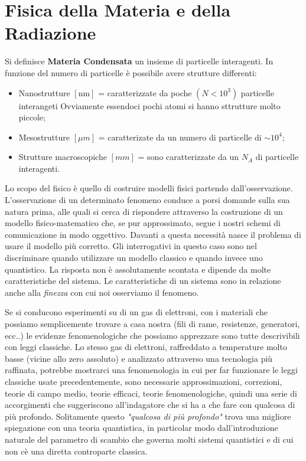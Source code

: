 \section{Fisica della Materia e della Radiazione}
Si definisce \textbf{Materia Condensata} un insieme di particelle interagenti. In funzione del numero di particelle è possibile avere strutture differenti:
\begin{itemize}
	\item Nanostrutture $[\text{nm}]$ = caratterizzate da poche $(N<10^3)$ particelle interangeti Ovviamente essendoci pochi atomi si hanno sttrutture molto piccole;
	\item Mesostrutture $[\mu m]$ = caratterizate da un numero di particelle di $\sim  10^4$;
	\item Strutture macroscopiche $[mm]$ = sono caratterizzate da un $N_A$ di particelle interagenti.
\end{itemize}
Lo scopo del fisico è quello di costruire modelli fisici partendo dall'osservazione. L'osservazione di un determinato fenomeno conduce a porsi domande sulla sua natura prima, alle quali si cerca di rispondere attraverso la costruzione di un modello fisico-matematico che, se pur approssimato, segue i nostri schemi di comunicazione in modo oggettivo. Davanti a questa necessità nasce il problema di usare il modello pi\`u corretto. Gli interrogativi in questo caso sono nel discriminare quando utilizzare un modello classico e quando invece uno quantistico. La risposta non \`e assolutamente scontata e dipende da molte caratteristiche del sistema.
Le caratteristiche di un sistema sono in relazione anche alla \textit{finezza} con cui noi osserviamo il fenomeno. 

Se si conducono esperimenti su di un gas di elettroni, con i materiali che possiamo semplicemente trovare a casa nostra (fili di rame, resistenze, generatori, ecc..) le evidenze fenomenologiche che possiamo apprezzare sono tutte descrivibili con leggi classiche. Lo stesso gas di elettroni, raffreddato a temperature molto basse (vicine allo zero assoluto) e analizzato attraverso una tecnologia pi\`u raffinata, potrebbe mostrarci una fenomenologia in cui per far funzionare le leggi classiche usate precedentemente, sono necessarie approssimazioni, correzioni, teorie di campo medio, teorie efficaci, teorie fenomenologiche, quindi una serie di accorgimenti che suggeriscono all'indagatore che si ha a che fare con qualcosa di pi\`u profondo. Solitamente questo \textit{"qualcosa di pi\`u profondo"} trova una migliore spiegazione con una teoria quantistica, in particolar modo dall'introduzione naturale del parametro di scambio che governa molti sistemi quantistici e di cui non c\`e una diretta controparte classica.

